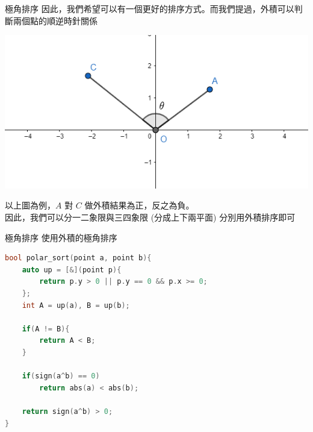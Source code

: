 \documentclass[aspectratio=169]{beamer}
\begin{document}
\begin{frame}[fragile]{極角排序}
    因此，我們希望可以有一個更好的排序方式。而我們提過，外積可以判斷兩個點的順逆時針關係
    \begin{center}
        \includegraphics[scale=0.4]{images/polar_angle_sort.png}
    \end{center}
    以上圖為例，$A$ 對 $C$ 做外積結果為正，反之為負。 \\
    \vspace{2.5mm}
    因此，我們可以分一二象限與三四象限 (分成上下兩平面) 分別用外積排序即可
\end{frame}

\begin{frame}[fragile]{極角排序}
    使用外積的極角排序
    \begin{lstlisting}[language=C++,basicstyle=\ttfamily\small]
bool polar_sort(point a, point b){
    auto up = [&](point p){
        return p.y > 0 || p.y == 0 && p.x >= 0;
    };
    int A = up(a), B = up(b);

    if(A != B){
        return A < B;
    }

    if(sign(a^b) == 0)
        return abs(a) < abs(b);

    return sign(a^b) > 0;
}
    \end{lstlisting}
\end{frame}
\end{document}
